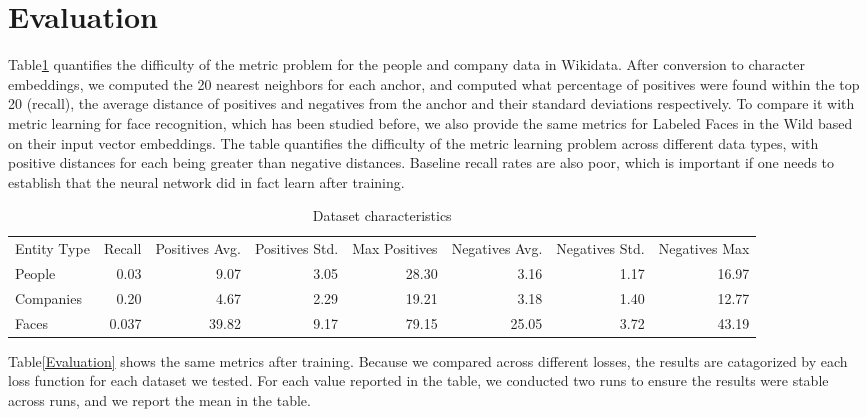 \section{Evaluation}
\label{results}

Table\ref{Characteristics} quantifies the difficulty of the metric problem for the people and company data in Wikidata.  After conversion to character embeddings, we computed the 20 nearest neighbors for each anchor, and computed what percentage of positives were found within the top 20 (recall), the average distance of positives and negatives from the anchor and their standard deviations respectively.  To compare it with metric learning for face recognition, which has been studied before, we also provide the same metrics for Labeled Faces in the Wild based on their input vector embeddings.  The table quantifies the difficulty of the metric learning problem across different data types, with positive distances for each being greater than negative distances.  Baseline recall rates are also poor, which is important if one needs to establish that the neural network did in fact learn after training.

\begin{table}[ht]
\caption{Dataset characteristics}
\label{Characteristics}
\begin{tabular}{l|r|r|r|r|r|r|r|}
\hline
Entity Type & Recall & Positives Avg. & Positives Std. & Max Positives & Negatives Avg. & Negatives Std. & Negatives Max \\
People & 0.03 & 9.07 & 3.05 & 28.30 & 3.16 & 1.17 & 16.97 \\
Companies & 0.20 & 4.67 & 2.29 & 19.21 & 3.18 & 1.40 & 12.77 \\
Faces & 0.037 & 39.82 & 9.17 & 79.15 & 25.05 & 3.72 & 43.19 \\
\end{tabular}
\end{table}

Table\ref{Evaluation} shows the same metrics after training.  Because we compared across different losses, the results are catagorized by each loss function for each dataset we tested.  For each value reported in the table, we conducted two runs to ensure the results were stable across runs, and we report the mean in the table.

